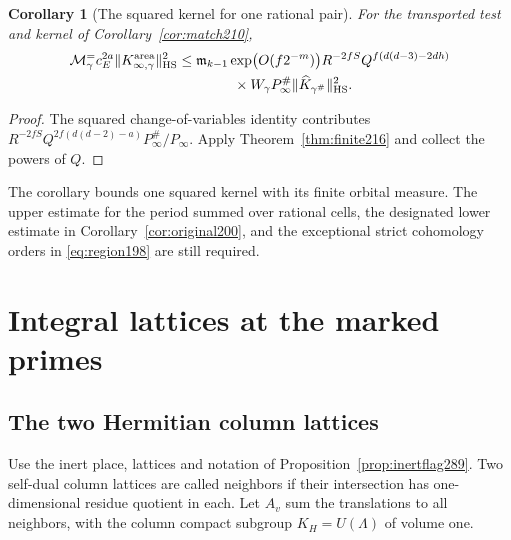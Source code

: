 \documentclass[a4paper,11pt]{article}
\newtheorem{corollary}[proposition]{Corollary}
\theoremstyle{definition}
\theoremstyle{remark}
\numberwithin{equation}{section}
\begin{document}
\begin{corollary}[The squared kernel for one rational pair]
\label{cor:square216}
For the transported test and kernel of Corollary~\ref{cor:match210},
\begin{align*}
 \mathcal M_\gamma^{=}c_E^{2a}\|K_{\infty,\gamma}^{\rm area}\|_{\rm HS}^2
 &\le \mathfrak m_{k-1}\exp\bigl(O(f2^{-m})\bigr)
             R^{-2fS}Q^{f(d(d-3)-2dh)}\\
 &\hspace{14mm}{}\times W_\gamma P_\infty^\#
                         \|\widehat K_{\gamma^\#}\|_{\rm HS}^2 .
\end{align*}
\end{corollary}
\begin{proof}
The squared change-of-variables identity contributes
\(R^{-2fS}Q^{2f(d(d-2)-a)}P_\infty^\#/P_\infty\).
Apply Theorem~\ref{thm:finite216} and collect the powers of \(Q\).
\end{proof}

The corollary bounds one squared kernel with its finite orbital
measure. The upper estimate for the period summed over rational
cells, the designated lower estimate in
Corollary~\ref{cor:original200}, and the exceptional strict
cohomology orders in \eqref{eq:region198} are still required.

\section{Integral lattices at the marked primes}\label{nav:g-IX-1}

\subsection{The two Hermitian column lattices}\label{nav:II-61}
Use the inert place, lattices and notation of
Proposition~\ref{prop:inertflag289}. Two self-dual column
lattices are called neighbors if their intersection has
one-dimensional residue quotient in each. Let \(A_v\) sum
the translations to all neighbors, with the column compact
subgroup \(K_H=U(\Lambda)\) of volume one.
\end{document}
